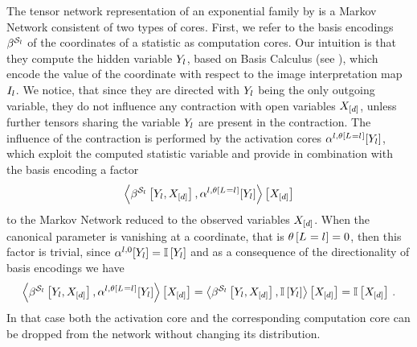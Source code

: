 The tensor network representation of an exponential family by  is a Markov Network consistent of two types of cores.
First, we refer to the basis encodings $\beta^{\mathcal{S}_{l}}$ of the coordinates of a statistic as computation cores.
Our intuition is that they compute the hidden variable $Y_{l}$, based on Basis Calculus (see ), which encode the value of the coordinate with respect to the image interpretation map $I_{l}$.
We notice, that since they are directed with $Y_{l}$ being the only outgoing variable, they do not influence any contraction with open variables $X_{[d]}$, unless further tensors sharing the variable $Y_{l}$ are present in the contraction.
The influence of the contraction is performed by the activation cores $\alpha^{l,\theta\left[L_{}=l_{}\right]}[Y_{l}]$, which exploit the computed statistic variable and provide in combination with the basis encoding a factor
\begin{align*}
    \left\langle \beta^{\mathcal{S}_{l}}\left[Y_{l},X_{[d]}\right],\alpha^{l,\theta\left[L_{}=l_{}\right]}[Y_{l}]\right\rangle \left[ X_{[d]} \right]
\end{align*}
to the Markov Network reduced to the observed variables $X_{[d]}$.
When the canonical parameter is vanishing at a coordinate, that is $\theta\left[L_{}=l_{}\right]=0$, then this factor is trivial, since $\alpha^{l,0}[Y_{l}]=\mathbb{I}\left[Y_{l}\right]$ and as a consequence of the directionality of basis encodings we have
\begin{align*}
    \left\langle \beta^{\mathcal{S}_{l}}\left[Y_{l},X_{[d]}\right],\alpha^{l,\theta\left[L_{}=l_{}\right]}[Y_{l}]\right\rangle \left[ X_{[d]} \right]
    = \left\langle \beta^{\mathcal{S}_{l}}\left[Y_{l},X_{[d]}\right],\mathbb{I}\left[Y_{l}\right]\right\rangle \left[ X_{[d]} \right]
    = \mathbb{I}\left[X_{[d]}\right] \, .
\end{align*}
In that case both the activation core and the corresponding computation core can be dropped from the network without changing its distribution.

